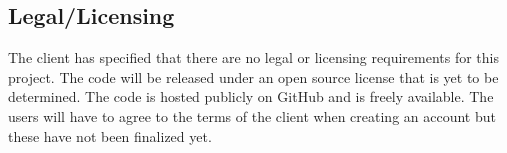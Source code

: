 \subsection{Legal/Licensing}
The client has specified that there are no legal or licensing requirements for this project. The code will be released under an open source license that is yet to be determined. The code is hosted publicly on GitHub and is freely available. The users will have to agree to the terms of the client when creating an account but these have not been finalized yet.